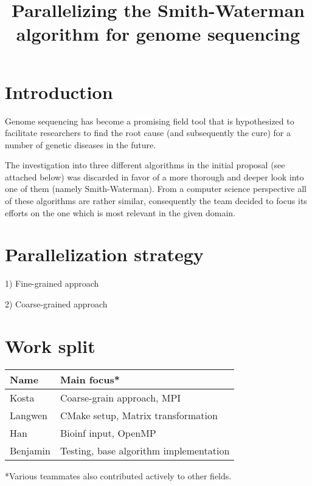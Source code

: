 \documentclass[letterpaper]{article}
\title{Parallelizing the Smith-Waterman algorithm for genome sequencing}
\begin{document}
%
\maketitle
%

\section{Introduction}

Genome sequencing has become a promising field tool that is hypothesized to facilitate researchers to find the root cause (and subsequently the cure) for a number of genetic diseases in the future. \cite{Maekinen.2015}

The investigation into three different algorithms in the initial proposal (see attached below) was discarded in favor of a more thorough and deeper look into one of them (namely Smith-Waterman). From a computer science perspective all of these algorithms are rather similar, consequently the team decided to focus its efforts on the one which is most relevant in the given domain.

\section{Parallelization strategy}
1) Fine-grained approach 

2) Coarse-grained approach


\section{Work split}



\begin{center}
	\begin{tabular}{ | m{1.5cm} | m{6cm} | } 
		\hline
		Name & Main focus* \\ 
		\hline
		Kosta & Coarse-grain approach, MPI \\ 
		Langwen & CMake setup, Matrix transformation \\ 
		Han & Bioinf input, OpenMP \\
		Benjamin & Testing, base algorithm implementation \\
		\hline
	\end{tabular}
\end{center}
*Various teammates also contributed actively to other fields.





\end{document}
